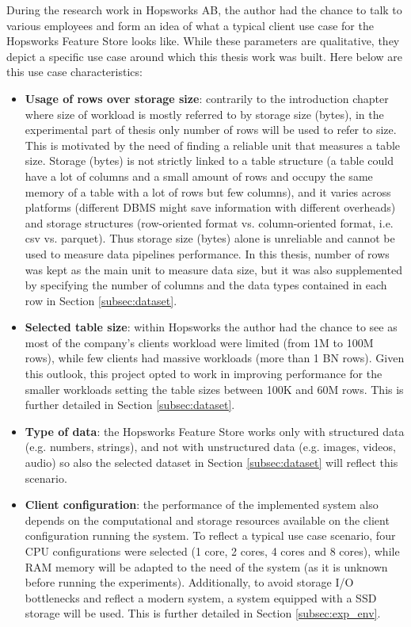 During the research work in Hopsworks AB, the author had the chance to talk to various employees and form an idea of what a typical client use case for the Hopsworks Feature Store looks like. While these parameters are qualitative, they depict a specific use case around which this thesis work was built. Here below are this use case characteristics:
\begin{itemize}
  \item \textbf{Usage of rows over storage size}: contrarily to the introduction chapter where size of workload is mostly referred to by storage size (bytes), in the experimental part of thesis only number of rows will be used to refer to size. This is motivated by the need of finding a reliable unit that measures a table size. Storage (bytes) is not strictly linked to a table structure (a table could have a lot of columns and a small amount of rows and occupy the same memory of a table with a lot of rows but few columns), and it varies across platforms (different \gls{DBMS} might save information with different overheads) and storage structures (row-oriented format vs. column-oriented format, i.e. csv vs. parquet). Thus storage size (bytes) alone is unreliable and cannot be used to measure data pipelines performance. In this thesis, number of rows was kept as the main unit to measure data size, but it was also supplemented by specifying the number of columns and the data types contained in each row in Section \ref{subsec:dataset}.
  \item \textbf{Selected table size}: within Hopsworks the author had the chance to see as most of the company's clients workload were limited (from 1M to 100M rows), while few clients had massive workloads (more than 1 BN rows). Given this outlook, this project opted to work in improving performance for the smaller workloads setting the table sizes between 100K and 60M rows. This is further detailed in Section \ref{subsec:dataset}.
  \item \textbf{Type of data}: the Hopsworks Feature Store works only with structured data (e.g. numbers, strings), and not with unstructured data (e.g. images, videos, audio) so also the selected dataset in Section \ref{subsec:dataset} will reflect this scenario.
  \item \textbf{Client configuration}: the performance of the implemented system also depends on the computational and storage resources available on the client configuration running the system. To reflect a typical use case scenario, four \gls{CPU} configurations were selected (1 core, 2 cores, 4 cores and 8 cores), while \gls{RAM} memory will be adapted to the need of the system (as it is unknown before running the experiments). Additionally, to avoid storage I/O bottlenecks and reflect a modern system, a system equipped with a \gls{SSD} storage will be used. This is further detailed in Section \ref{subsec:exp_env}.
\end{itemize}

